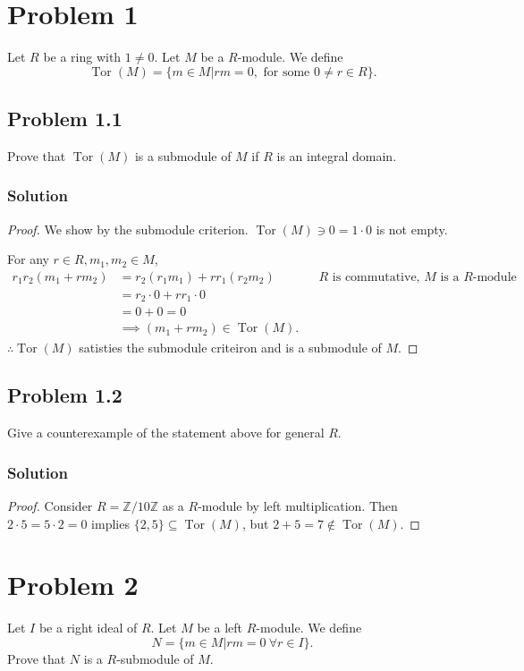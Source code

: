 \documentclass{article}
\title{\mytitle}
\author{\myname}
\date{\today}
\theoremstyle{plain}
\newcommand{\Z}{\mathbb{Z}}
\DeclareMathOperator{\Tor}{Tor}
\begin{document}
\maketitle
\section*{Problem 1}
Let $R$ be a ring with $1\ne0$. Let $M$ be a $R$-module. We define
\[\Tor(M)=\{m\in M|rm=0,\text{ for some }0\ne r\in R\}.\]
\subsection*{Problem 1.1}
Prove that $\Tor(M)$ is a submodule of $M$ if $R$ is an integral domain.
\subsubsection*{Solution}
\begin{proof}
  We show by the submodule criterion.
  $\Tor(M)\ni0=1\cdot0$ is not empty.

  For any $r\in R, m_{1},m_{2}\in M$,
  \begin{align*}
    r_{1}r_{2}(m_{1}+rm_{2}) &= r_{2}(r_{1}m_{1})+rr_{1}(r_{2}m_{2})
    &&\text{$R$ is commutative, $M$ is a $R$-module}\\
                             &=r_{2}\cdot0+rr_{1}\cdot0\\ &=0+0=0\\
                             &\implies (m_{1}+rm_{2})\in\Tor(M).
  \end{align*}
  $\therefore\Tor(M)$ satisties the submodule criteiron and is a submodule of $M$.
\end{proof}
\subsection*{Problem 1.2}
Give a counterexample of the statement above for general $R$.
\subsubsection*{Solution}
\begin{proof}
  Consider $R=\Z/10\Z$ as a $R$-module by left multiplication. Then
  $2\cdot5=5\cdot2=0$ implies $\{2,5\}\subseteq\Tor(M)$, but $2+5=7\notin\Tor(M)$.
\end{proof}

\section*{Problem 2}
Let $I$ be a right ideal of $R$. Let $M$ be a left $R$-module. We define
\[N=\{m\in M|rm=0\ \forall r\in I\}.\] Prove that $N$ is a $R$-submodule of $M$.
\end{document}
